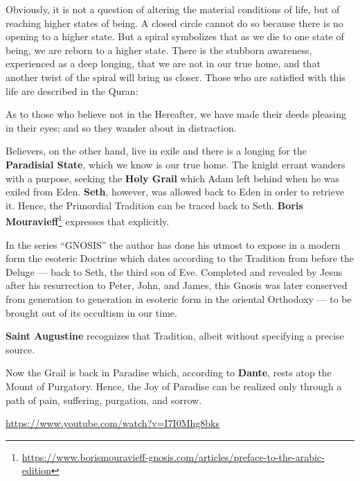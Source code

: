Obviously, it is not a question of altering the material conditions of life, but of reaching higher states of being. A closed circle cannot do so because there is no opening to a higher state. But a spiral symbolizes that as we die to one state of being, we are reborn to a higher state. There is the stubborn awareness, experienced as a deep longing, that we are not in our true home, and that another twist of the spiral will bring us closer. Those who are satisfied with this life are described in the Quran:

\begin{quotex}
As to those who believe not in the Hereafter, we have made their deeds pleasing in their eyes; and so they wander about in distraction.
\end{quotex}


Believers, on the other hand, live in exile and there is a longing for the \textbf{Paradisial State}, which we know is our true home. The knight errant wanders with a purpose, seeking the \textbf{Holy Grail} which Adam left behind when he was exiled from Eden. \textbf{Seth}, however, was allowed back to Eden in order to retrieve it. Hence, the Primordial Tradition can be traced back to Seth. \textbf{Boris Mouravieff}\footnote{\url{https://www.borismouravieff-gnosis.com/articles/preface-to-the-arabic-edition}} expresses that explicitly.

\begin{quotex}
In the series ``GNOSIS'' the author has done his utmost to expose in a modern form the esoteric Doctrine which dates according to the Tradition from before the Deluge --- back to Seth, the third son of Eve. Completed and revealed by Jesus after his resurrection to Peter, John, and James, this Gnosis was later conserved from generation to generation in esoteric form in the oriental Orthodoxy --- to be brought out of its occultism in our time.
\end{quotex}


\textbf{Saint Augustine} recognizes that Tradition, albeit without specifying a precise source.

Now the Grail is back in Paradise which, according to \textbf{Dante}, rests atop the Mount of Purgatory. Hence, the Joy of Paradise can be realized only through a path of pain, suffering, purgation, and sorrow.

\url{https://www.youtube.com/watch?v=I7I0Mhg8bks} 


